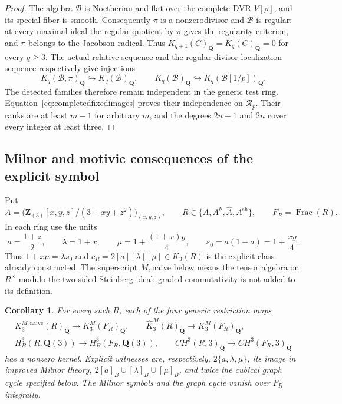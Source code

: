 \documentclass[11pt,a4paper]{article}
\newtheorem{corollary}[theorem]{Corollary}
\theoremstyle{remark}
\newcommand{\Q}{\mathbf Q}
\begin{document}
\begin{proof}
The algebra $\mathcal B$ is Noetherian and flat over the complete
DVR $V[\rho]$, and its special fiber is smooth.
Consequently $\pi$ is a nonzerodivisor and $\mathcal B$ is regular:
at every maximal ideal the regular quotient by $\pi$ gives the
regularity criterion, and $\pi$ belongs to the Jacobson radical.
Thus $K_{q+1}(C)_{\Q}=K_q(C)_{\Q}=0$ for every $q\geq3$.
The actual relative sequence and the regular-divisor
localization sequence respectively give injections
\[
 K_q(\mathcal B,\pi)_{\Q}\hookrightarrow K_q(\mathcal B)_{\Q},
 \qquad
 K_q(\mathcal B)_{\Q}\hookrightarrow
                     K_q(\mathcal B[1/p])_{\Q}.
\]
The detected families therefore remain independent in the
generic test ring. Equation~\eqref{eq:completedfixedimages}
proves their independence on $\mathcal R_p$.
Their ranks are at least $m-1$ for arbitrary $m$, and the
degrees $2n-1$ and $2n$ cover every integer at least three.
\end{proof}


\subsection{Milnor and motivic consequences of the explicit symbol}
\label{sec:milnormotivicconsequences}

Put
\[
 A=\bigl(\mathbf Z_{(3)}[x,y,z]/(3+xy+z^2)\bigr)_{(x,y,z)},
 \qquad R\in\{A,A^h,\widehat A,A^{\mathrm{sh}}\},
 \qquad F_R=\operatorname{Frac}(R).
\]
In each ring use the units
\[
 a=\frac{1+z}{2},\qquad \lambda=1+x,\qquad
 \mu=1+\frac{(1+x)y}{4},\qquad
 s_0=a(1-a)=1+\frac{xy}{4}.
\]
Thus $1+x\mu=\lambda s_0$ and
$c_R=2[a][\lambda][\mu]\in K_3(R)$ is the explicit class already
constructed. The superscript $M,\mathrm{naive}$ below means the
tensor algebra on $R^\times$ modulo the two-sided Steinberg ideal;
graded commutativity is not added to its definition.

\begin{corollary}\label{cor:explicitmilnormotivic}
For every such $R$, each of the four generic restriction maps
\[
\begin{gathered}
 K_3^{M,\mathrm{naive}}(R)_{\mathbf Q}
       \longrightarrow K_3^M(F_R)_{\mathbf Q},\qquad
 \widehat K_3^M(R)_{\mathbf Q}
       \longrightarrow K_3^M(F_R)_{\mathbf Q},\\
 H_B^3(R,\mathbf Q(3))\longrightarrow H_B^3(F_R,\mathbf Q(3)),
 \qquad
 CH^3(R,3)_{\mathbf Q}\longrightarrow CH^3(F_R,3)_{\mathbf Q}
\end{gathered}
\]
has a nonzero kernel. Explicit witnesses are, respectively,
$2\{a,\lambda,\mu\}$, its image in improved Milnor theory,
$2[a]_B\cup[\lambda]_B\cup[\mu]_B$, and twice the cubical graph
cycle specified below. The Milnor symbols and the graph cycle vanish
over $F_R$ integrally.
\end{corollary}
\end{document}
